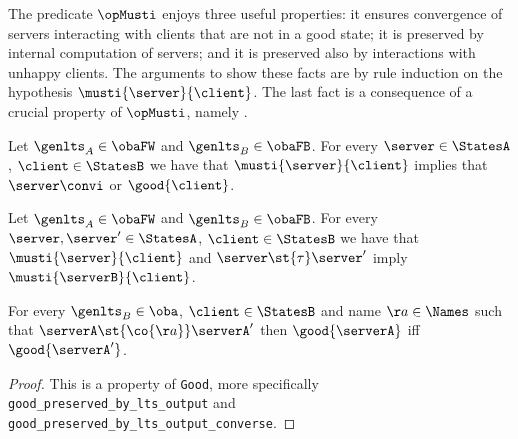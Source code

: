 


The predicate $\opMusti$ enjoys three useful properties:
it ensures convergence of servers interacting with clients
that are not in a good state; it is preserved by internal computation
of servers; and it is preserved also by interactions with unhappy clients.
The arguments to show these facts are by rule induction on the
hypothesis $\musti{ \server }{\client }$.
The last fact is a consequence of a crucial property of $\opMusti$,
namely .

\begin{lemma}%
  \label{lem:must-terminate}
  Let $\genlts_A \in \obaFW$ and $\genlts_B \in \obaFB$.
  For every $\server \in \StatesA$, $\client \in \StatesB$ we have that
  $\musti{ \server }{\client }$ implies that $\server \convi$ or $\good{\client}$.
\end{lemma}



\begin{lemma}%
  \label{lem:must-lts-a-tau}
  \label{lem:musti-preserved-by-left-tau}
  Let $\genlts_A \in \obaFW$ and $\genlts_B \in \obaFB$.
  For every $\server, \server' \in \StatesA$, $\client \in \StatesB$ we have that
  $\musti{\server}{\client} $ and $\server \st{\tau} \server'$ imply
  $\musti{\serverB}{\client}$.
\end{lemma}



\begin{lemma}
  \label{lem:good-preserved-by-lts-output-iff}
  For every $\genlts_B \in \oba$, $\client \in \StatesB$
  and name $\aa \in \Names$ such that
  $\serverA \st{\co{\aa}} \serverA'$ then
  $\good{\serverA}$ iff $\good{\serverA'}$.
\end{lemma}
\begin{proof}
  This is a property of \lstinline{Good}, more specifically
  \lstinline{good_preserved_by_lts_output} and \lstinline{good_preserved_by_lts_output_converse}.
\end{proof}


